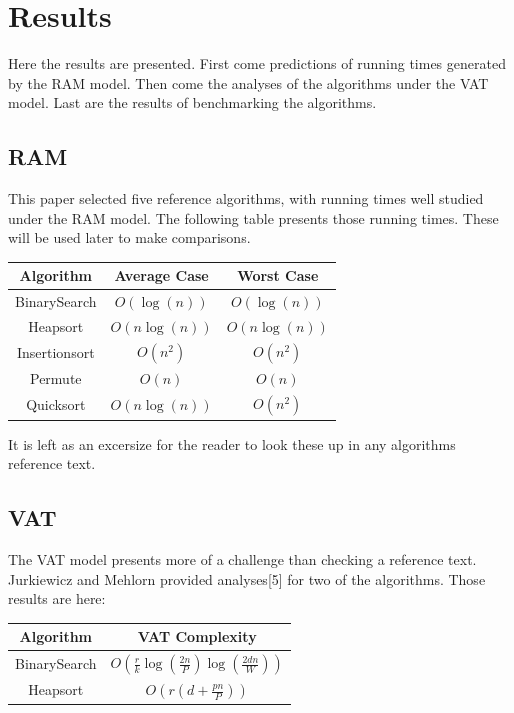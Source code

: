 \section{Results}

  Here the results are presented. First come predictions of running times
  generated by the RAM model. Then come the analyses of the algorithms under
  the VAT model. Last are the results of benchmarking the algorithms.

  \subsection{RAM}
    This paper selected five reference algorithms, with running times well 
    studied under the RAM model. The following table presents those running
    times. These will be used later to make comparisons.
    
    \begin{tabular}{ccc}
      Algorithm     & Average Case  & Worst Case   \\\hline
      BinarySearch  & $O(\log(n))$  & $O(\log(n))$ \\
      Heapsort      & $O(n\log(n))$ & $O(n\log(n))$\\
      Insertionsort & $O(n^2)$      & $O(n^2)$     \\
      Permute       & $O(n)$        & $O(n)$       \\
      Quicksort     & $O(n\log(n))$ & $O(n^2)$     \\
    \end{tabular}
    
    It is left as an excersize for the reader to look these up in any
    algorithms reference text.

  \subsection{VAT}
    The VAT model presents more of a challenge than checking a reference text.
    Jurkiewicz and Mehlorn provided analyses[5] for two of the algorithms. 
    Those results are here:
    
    \begin{tabular}{cc}
      Algorithm    & VAT Complexity\\\hline
      BinarySearch &
$O\left(\frac{r}{k}\log(\frac{2n}{P})\log(\frac{2dn}{W})\right)$ \\
      Heapsort     & $O\left(r(d+\frac{pn}{P})\right)$ \\
    \end{tabular}
    
